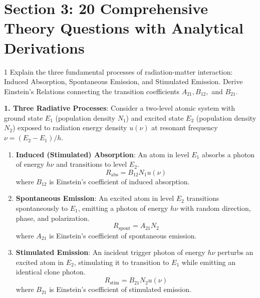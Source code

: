 \newpage
\section{Section 3: 20 Comprehensive Theory Questions with Analytical Derivations}

\begin{theoryq}{1}
Explain the three fundamental processes of radiation-matter interaction: Induced Absorption, Spontaneous Emission, and Stimulated Emission. Derive Einstein's Relations connecting the transition coefficients $A_{21}, B_{12},$ and $B_{21}$.
\end{theoryq}
\begin{theorysol}
\textbf{1. Three Radiative Processes}:
Consider a two-level atomic system with ground state $E_1$ (population density $N_1$) and excited state $E_2$ (population density $N_2$) exposed to radiation energy density $u(\nu)$ at resonant frequency $\nu = (E_2 - E_1)/h$.
\begin{enumerate}
    \item \textbf{Induced (Stimulated) Absorption}: An atom in level $E_1$ absorbs a photon of energy $h\nu$ and transitions to level $E_2$.
    \begin{equation}
    R_{\text{abs}} = B_{12} N_1 u(\nu)
    \end{equation}
    where $B_{12}$ is Einstein's coefficient of induced absorption.
    \item \textbf{Spontaneous Emission}: An excited atom in level $E_2$ transitions spontaneously to $E_1$, emitting a photon of energy $h\nu$ with random direction, phase, and polarization.
    \begin{equation}
    R_{\text{spont}} = A_{21} N_2
    \end{equation}
    where $A_{21}$ is Einstein's coefficient of spontaneous emission.
    \item \textbf{Stimulated Emission}: An incident trigger photon of energy $h\nu$ perturbs an excited atom in $E_2$, stimulating it to transition to $E_1$ while emitting an identical clone photon.
    \begin{equation}
    R_{\text{stim}} = B_{21} N_2 u(\nu)
    \end{equation}
    where $B_{21}$ is Einstein's coefficient of stimulated emission.
\end{enumerate}


\end{theorysol}

